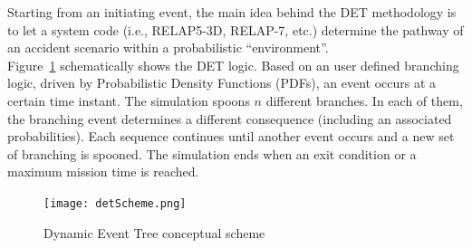 \documentclass{anstrans}
\begin{document}
Starting from an initiating event, the main idea behind the DET methodology is to let a system code (i.e., RELAP5-3D, RELAP-7, etc.) determine the pathway of an accident scenario within a probabilistic ``environment''. \\ Figure~\ref{fig:detScheme} schematically shows the DET logic. Based on an user defined branching logic, driven by Probabilistic Density Functions (PDFs), an event occurs at a certain time instant. The simulation spoons $n$ different branches. In each of them, the branching event determines a different consequence (including an associated probabilities). Each sequence continues until another event occurs and a new set of branching is spooned. The simulation ends when an exit condition or a maximum mission time is reached.       
\begin{figure} %
  \centering
  \texttt{[image: detScheme.png]}
  \caption{Dynamic Event Tree conceptual scheme}
  \label{fig:detScheme}
\end{figure} 
\end{document}
